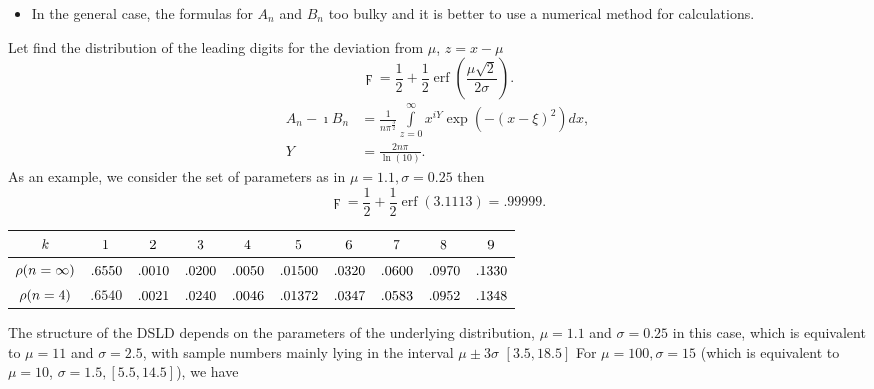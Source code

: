 \documentclass[titlepage,fleqn]{article}%
\begin{document}
\begin{itemize}
\item In the general case, the formulas for $A_{n}$ and $B_{n}$ too bulky and
it is better to use a numerical method for calculations.
\end{itemize}

Let find the distribution of the leading digits for the deviation from $\mu$,
$z=x-\mu$%
\[
\digamma=\frac{1}{2}+\frac{1}{2}\operatorname{erf}\left(  \frac{\mu\sqrt{2}%
}{2\sigma}\right)  .
\]%
\begin{align*}
A_{n}-\imath B_{n}  &  =\frac{1}{n\pi^{\frac{3}{2}}}%
{\displaystyle\int\limits_{z=0}^{\infty}}
x^{iY}\exp\left(  -(x-\xi)^{2}\right)  dx,\\
Y  &  =\frac{2n\pi}{\ln(10)}.
\end{align*}
As an example, we consider the set of parameters as in
\cite{formann0}
$\mu=1.1,\sigma=0.25$ then%
\[
\digamma=\frac{1}{2}+\frac{1}{2}\operatorname{erf}\left(  3.1113\right)
=.99999.
\]%
\begin{tabular}
[c]{|c|c|c|c|c|c|c|c|c|c|}\hline\hline
${\small k}$ & ${\small 1}$ & ${\small 2}$ & ${\small 3}$ & ${\small 4}$ &
${\small 5}$ & ${\small 6}$ & ${\small 7}$ & ${\small 8}$ & ${\small 9}%
$\\\hline
${\small \rho(n=\infty)}$ & ${\small .6550}$ & ${\small .0010}$ &
${\small .0200}$ & ${\small .0050}$ & ${\small .01500}$ & ${\small .0320}$ &
${\small .0600}$ & ${\small .0970}$ & ${\small .1330}$\\\hline
${\small \rho(n=4)}$ & {\small .}$6540$ & ${\small .0021}$ & ${\small .0240} $
& ${\small .0046}$ & ${\small .01372}$ & ${\small .0347}$ & ${\small .0583} $
& ${\small .0952}$ & ${\small .1348}$\\\hline\hline
\end{tabular}


\bigskip

The structure of the DSLD depends on the parameters of the underlying
distribution, $\mu=1.1$ and $\sigma=0.25$ in this case, which is equivalent to
$\mu=11$ and $\sigma=2.5$, with sample numbers mainly lying in the interval
$\mu\pm3\sigma$ $[3.5,18.5]$ For $\mu=100,\sigma=15$ (which is equivalent to
$\mu=10$, $\sigma=1.5,[5.5,14.5]$), we have

\bigskip%
\end{document}
